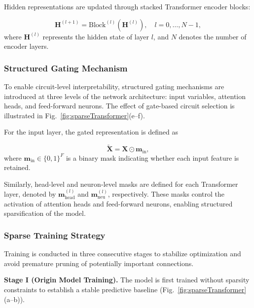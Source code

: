 Hidden representations are updated through stacked Transformer encoder blocks\cite{AttentionIsAllYouNeed}:

\begin{equation}
    \mathbf{H}^{(l+1)}=\mathrm{Block}^{(l)}(\mathbf{H}^{(l)}), \quad l=0,\dots,N-1,
\end{equation}
where $\mathbf{H}^{(l)}$ represents the hidden state of layer $l$, and $N$ denotes the number of encoder layers.

\subsubsection{Structured Gating Mechanism}

To enable circuit-level interpretability, structured gating mechanisms are introduced at three levels of the network architecture: input variables, attention heads, and feed-forward neurons\cite{louizos2018learningsparseneuralnetworks}. The effect of gate-based circuit selection is illustrated in Fig.~\ref{fig:sparseTransformer}(e--f).

For the input layer, the gated representation is defined as

\begin{equation}
    \tilde{\mathbf{X}}=\mathbf{X}\odot \mathbf{m}_{\mathrm{in}},
\end{equation}
where $\mathbf{m}_{\mathrm{in}}\in\{0,1\}^{F}$ is a binary mask indicating whether each input feature is retained.

Similarly, head-level and neuron-level masks are defined for each Transformer layer, denoted by $\mathbf{m}_{\mathrm{head}}^{(l)}$ and $\mathbf{m}_{\mathrm{neu}}^{(l)}$, respectively. These masks control the activation of attention heads and feed-forward neurons\cite{TFT}, enabling structured sparsification of the model.

\subsubsection{Sparse Training Strategy}

Training is conducted in three consecutive stages to stabilize optimization and avoid premature pruning of potentially important connections\cite{NIPS2015_three_step_pruning}.

\textbf{Stage I (Origin Model Training).}
The model is first trained without sparsity constraints to establish a stable predictive baseline (Fig.~\ref{fig:sparseTransformer}(a--b)).

